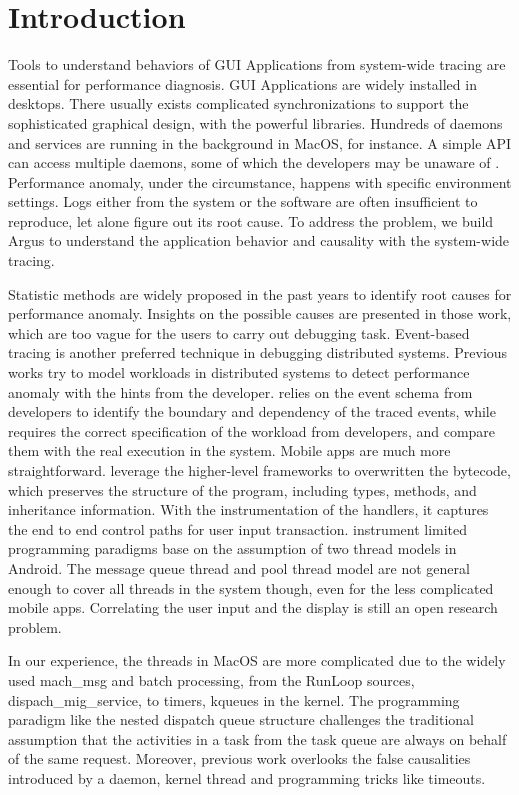 \section{Introduction}
Tools to understand behaviors of GUI Applications from system-wide tracing are essential for performance diagnosis.
GUI Applications are widely installed in desktops.
There usually exists complicated synchronizations to support the sophisticated graphical design, with the powerful libraries.
Hundreds of daemons and services are running in the background in MacOS, for instance.
A simple API can access multiple daemons, some of which the developers may be unaware of \cite{a file is not a file}.
Performance anomaly, under the circumstance, happens with specific environment settings. 
Logs either from the system or the software are often insufficient to reproduce, let alone figure out its root cause.
To address the problem, we build Argus to understand the application behavior and causality with the system-wide tracing.

Statistic methods are widely proposed in the past years\cite{} to identify root causes for performance anomaly.
Insights on the possible causes are presented in those work, which are too vague for the users to carry out debugging task.
Event-based tracing is another preferred technique in debugging distributed systems.
Previous works \cite{magpie, pip} try to model workloads in distributed systems to detect performance anomaly with the hints from the developer.
\cite{magpie} relies on the event schema from developers to identify the boundary and dependency of the traced events, while \cite{pip} requires the correct specification of the workload from developers, and compare them with the real execution in the system.
Mobile apps are much more straightforward.
\cite{AppInsight} leverage the higher-level frameworks to overwritten the bytecode, which preserves the structure of the program, including types, methods, and inheritance information.
With the instrumentation of the handlers, it captures the end to end control paths for user input transaction.
\cite{Panappticon} instrument limited programming paradigms base on the assumption of two thread models in Android.
The message queue thread and pool thread model are not general enough to cover all threads in the system though, even for the less complicated mobile apps.
Correlating the user input and the display is still an open research problem.

In our experience, the threads in MacOS are more complicated due to the widely used mach\_msg and batch processing, from the RunLoop sources, dispach\_mig\_service, to timers, kqueues in the kernel.
The programming paradigm like the nested dispatch queue structure challenges the traditional assumption that the activities in a task from the task queue are always on behalf of the same request.
Moreover, previous work overlooks the false causalities introduced by a daemon, kernel thread and programming tricks like timeouts.

